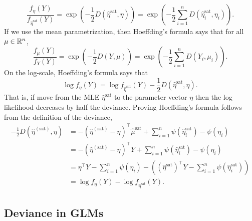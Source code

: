 \begin{equation}
    \frac{f_{\eta}(Y)}{f_{\hat{\eta}^{\text{sat}}}(Y)} =\exp\left(-\frac{1}{2}D(\hat{\eta}^{\text{sat}}, \eta)\right) = \exp\left(-\frac{1}{2}\sum_{i=1}^n D(\hat{\eta}^{\text{sat}}_i, \eta_i)\right). \label{eq hoeff1}
\end{equation}
If we use the mean parametrization, then Hoeffding's formula says that for all $\mu \in \mathbb{R}^n$, 
\begin{equation}
    \frac{f_{\mu}(Y)}{f_{Y}(Y)}=\exp\left(-\frac{1}{2}D(Y,\mu)\right) = \exp\left(-\frac{1}{2}\sum_{i=1}^n D(Y_i, \mu_i)\right). \label{eq hoeff2}
\end{equation}
On the log-scale, Hoeffding's formula says that
\[\log f_\eta (Y) = \log f_{\hat{\eta}^{\text{sat}}}(Y) - \frac{1}{2}D(\hat{\eta}^{\text{sat}}, \eta). \]
That is, if move from the MLE $\hat{\eta}^{\text{sat}}$ to the parameter vector $\eta$ then the log likelihood decreases by half the deviance. Proving Hoeffding's formula follows from the definition of the deviance,
\begin{align*}
    -\frac{1}{2}D(\hat{\eta}^{(\text{sat})},\eta) &=-\left(\hat{\eta}^{(\text{sat})}-\eta\right)^\top \hat{\mu}^{\text{sat}} + \sum_{i=1}^n \psi(\hat{\eta}_i^{\text{sat}}) - \psi(\eta_i)\\
    &=-\left(\hat{\eta}^{(\text{sat})}-\eta\right)^\top Y + \sum_{i=1}^n \psi(\hat{\eta}_i^{\text{sat}}) - \psi(\eta_i)\\
    &=\eta^\top Y-\sum_{i=1}^n \psi(\eta_i) -\left((\hat{\eta}^{\text{sat}})^\top Y-\sum_{i=1}^n \psi(\hat{\eta}_i^{\text{sat}})\right)\\
    &=\log f_\eta(Y) - \log f_{\hat{\eta}^{\text{sat}}}(Y).
\end{align*}


\subsection{Deviance in GLMs}

